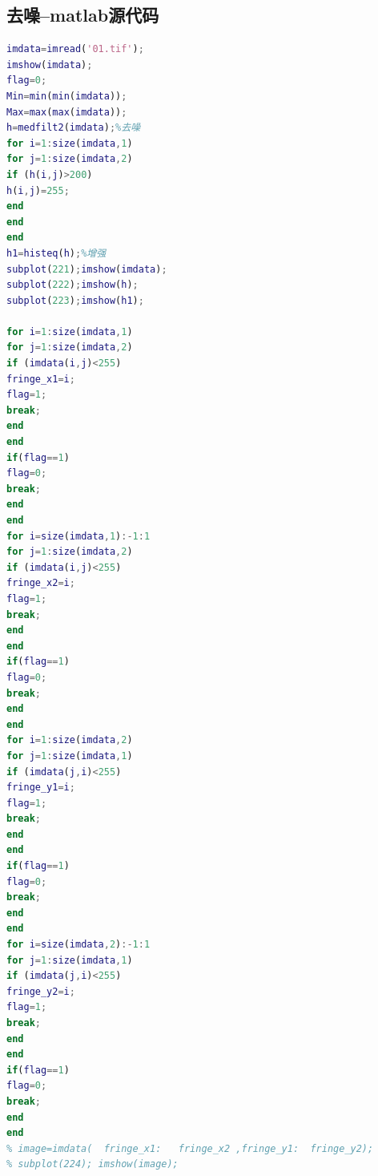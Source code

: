 \documentclass{whutmod}
\begin{document}
\subsection*{去噪--matlab源代码}
\begin{lstlisting}[language=matlab]
imdata=imread('01.tif');
imshow(imdata);
flag=0;
Min=min(min(imdata));
Max=max(max(imdata));
h=medfilt2(imdata);%去噪
for i=1:size(imdata,1)
for j=1:size(imdata,2)
if (h(i,j)>200)
h(i,j)=255;
end
end
end
h1=histeq(h);%增强
subplot(221);imshow(imdata);
subplot(222);imshow(h);
subplot(223);imshow(h1);

for i=1:size(imdata,1)
for j=1:size(imdata,2)
if (imdata(i,j)<255)
fringe_x1=i;
flag=1;
break;
end
end
if(flag==1)
flag=0;
break;
end
end
for i=size(imdata,1):-1:1
for j=1:size(imdata,2)
if (imdata(i,j)<255)
fringe_x2=i;
flag=1;
break;
end
end
if(flag==1)
flag=0;
break;
end
end
for i=1:size(imdata,2)
for j=1:size(imdata,1)
if (imdata(j,i)<255)
fringe_y1=i;
flag=1;
break;
end
end
if(flag==1)
flag=0;
break;
end
end
for i=size(imdata,2):-1:1
for j=1:size(imdata,1)
if (imdata(j,i)<255)
fringe_y2=i;
flag=1;
break;
end
end
if(flag==1)
flag=0;
break;
end
end
% image=imdata(  fringe_x1:   fringe_x2 ,fringe_y1:  fringe_y2);
% subplot(224); imshow(image);
\end{lstlisting}
\end{document}
